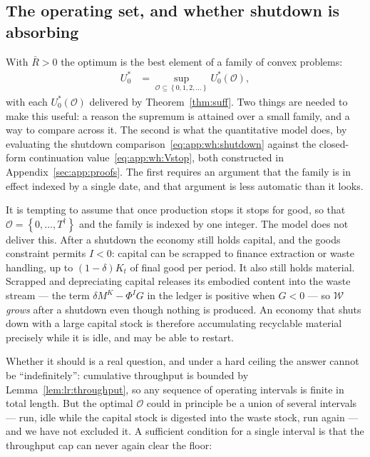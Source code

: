 \subsection{The operating set, and whether shutdown is absorbing}\label{sec:app:suff:regimes}

With $\bar R>0$ the optimum is the best element of a family of convex problems:
\begin{align}
U_0^{\ast} &= \sup_{\mathcal O\subseteq\left\{0,1,2,\dots\right\}} U_0^{\ast}\left(\mathcal O\right),
\label{eq:app:suff:regime-sup}
\end{align}
with each $U_0^{\ast}\left(\mathcal O\right)$ delivered by Theorem~\ref{thm:suff}. Two things are needed to make this useful: a reason the supremum is attained over a small family, and a way to compare across it. The second is what the quantitative model does, by evaluating the shutdown comparison~\eqref{eq:app:wh:shutdown} against the closed-form continuation value~\eqref{eq:app:wh:Vstop}, both constructed in Appendix~\ref{sec:app:proofs}. The first requires an argument that the family is in effect indexed by a single date, and that argument is less automatic than it looks.

 It is tempting to assume that once production stops it stops for good, so that $\mathcal O=\left\{0,\dots,T^{\dagger}\right\}$ and the family is indexed by one integer. The model does not deliver this. After a shutdown the economy still holds capital, and the goods constraint permits $I<0$: capital can be scrapped to finance extraction or waste handling, up to $\left(1-\delta\right)K_t$ of final good per period. It also still holds material. Scrapped and depreciating capital releases its embodied content into the waste stream --- the term $\delta M^K-\Phi^IG$ in the ledger is positive when $G<0$ --- so $\mathcal W$ \emph{grows} after a shutdown even though nothing is produced. An economy that shuts down with a large capital stock is therefore accumulating recyclable material precisely while it is idle, and may be able to restart.

Whether it should is a real question, and under a hard ceiling the answer cannot be ``indefinitely'': cumulative throughput is bounded by Lemma~\ref{lem:lr:throughput}, so any sequence of operating intervals is finite in total length. But the optimal $\mathcal O$ could in principle be a union of several intervals --- run, idle while the capital stock is digested into the waste stock, run again --- and we have not excluded it. A sufficient condition for a single interval is that the throughput cap can never again clear the floor:

